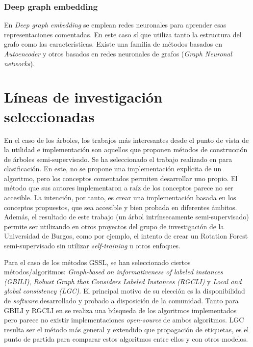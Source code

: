 \subsubsection{Deep graph embedding}

En \textit{Deep graph embedding} se emplean redes neuronales para aprender esas representaciones comentadas. En este caso sí que utiliza tanto la estructura del grafo como las características. Existe una familia de métodos basados en \textit{Autoencoder} y otros basados en redes neuronales de grafos (\textit{Graph Neuronal networks}).

\section{Líneas de investigación seleccionadas}

En el caso de los árboles, los trabajos más interesantes desde el punto de vista de la utilidad e implementación son aquellos que proponen métodos de construcción de árboles semi-supervisado. Se ha seleccionado el trabajo realizado en \cite{levatic2017semi} para clasificación. En este, no se propone una implementación explícita de un algoritmo, pero los conceptos comentados permiten desarrollar uno propio. El método que sus autores implementaron a raíz de los conceptos parece no ser accesible. La intención, por tanto, es crear una implementación basada en los conceptos propuestos, que sea accesible y bien probada en diferentes ámbitos. Además, el resultado de este trabajo (un árbol intrínsecamente semi-supervisado) permite ser utilizando en otros proyectos del grupo de investigación de la Universidad de Burgos, como por ejemplo, el intento de crear un Rotation Forest semi-supervisado sin utilizar \textit{self-training} u otros enfoques.

Para el caso de los métodos GSSL, se han seleccionado ciertos métodos/algoritmos: \textit{Graph-based
on informativeness of labeled instances (GBILI)}, \textit{Robust Graph that Considers Labeled Instances (RGCLI)} y \textit{Local and global consistency (LGC)}. El principal motivo de su elección es la disponibilidad de \textit{software} desarrollado y probado a disposición de la comunidad. Tanto para GBILI y RGCLI en \cite{song2022graph} se realiza una búsqueda de los algoritmos implementados pero parece no existir implementaciones \textit{open-source} de ambos algoritmos. LGC resulta ser el método más general y extendido que propagación de etiquetas, es el punto de partida para comparar estos algoritmos entre ellos y con otros modelos.


